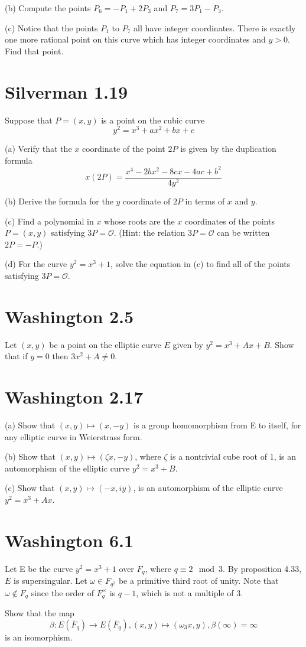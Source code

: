 \documentclass{article}
\begin{document}
(b) Compute the points $P_6 = -P_1 + 2P_3$ and $P_7 = 3P_1 - P_3$.

(c) Notice that the points $P_1$ to $P_7$ all have integer coordinates. There is exactly one more rational point on this curve which has integer coordinates and $y > 0$. Find that point.

\section{Silverman 1.19}
Suppose that $P = (x,y)$ is a point on the cubic curve
$$y^2 = x^3 + ax^2 + bx + c$$

(a) Verify that the $x$ coordinate of the point $2P$ is given by the duplication formula
$$x(2P) = \frac{x^4 - 2bx^2 - 8cx - 4ac + b^2}{4y^2}$$

(b) Derive the formula for the $y$ coordinate of $2P$ in terms of $x$ and $y$.

(c) Find a polynomial in $x$ whose roots are the $x$ coordinates of the points $P=(x,y)$ satisfying $3P=\mathcal{O}$. (Hint: the relation $3P = \mathcal{O}$ can be written $2P = -P$.)

(d) For the curve $y^2 = x^3 + 1$, solve the equation in (c) to find all of the points satisfying $3P = \mathcal{O}$.

\section{Washington 2.5}
Let $(x,y)$ be a point on the elliptic curve $E$ given by $y^2 = x^3 + Ax + B$. Show that if $y = 0$ then $3x^2 + A \neq 0$. 

\section{Washington 2.17}
(a) Show that $(x,y) \mapsto (x,−y)$ is a group homomorphism from E to itself, for any elliptic curve in Weierstrass form.

(b) Show that $(x,y) \mapsto (\zeta x,−y)$, where $\zeta$ is a nontrivial cube root of 1, is an automorphism of the elliptic curve $y^2 = x^3 + B$.

(c) Show that $(x, y) \mapsto (−x, iy)$, is an automorphism of the elliptic curve $y^2 = x^3 + Ax$.

\section{Washington 6.1}
Let E be the curve $y^2 = x^3+1$ over $F_q$, where $q \equiv 2 \mod 3$. By proposition 4.33, $E$ is supersingular. Let $\omega \in F_{q^2}$ be a primitive third root of unity. Note that $\omega \not \in F_q$ since the order of $F_q^\times$ is $q−1$, which is not a multiple of $3$.

Show that the map
$$\beta: E(\bar F_q) \to E(\bar F_q), (x,y) \mapsto (\omega_3 x, y), \beta(\infty) = \infty$$
is an isomorphism.
\end{document}
